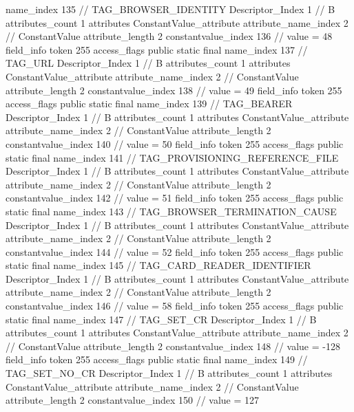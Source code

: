 {{{{{				name_index	135		// TAG_BROWSER_IDENTITY
				Descriptor_Index	1		// B
				attributes_count	1
				attributes {
				ConstantValue_attribute {
					attribute_name_index	2		// ConstantValue
					attribute_length	2
					constantvalue_index	136		// value = 48
				}
				}
			}
			field_info {
				token	255
				access_flags	public static final
				name_index	137		// TAG_URL
				Descriptor_Index	1		// B
				attributes_count	1
				attributes {
				ConstantValue_attribute {
					attribute_name_index	2		// ConstantValue
					attribute_length	2
					constantvalue_index	138		// value = 49
				}
				}
			}
			field_info {
				token	255
				access_flags	public static final
				name_index	139		// TAG_BEARER
				Descriptor_Index	1		// B
				attributes_count	1
				attributes {
				ConstantValue_attribute {
					attribute_name_index	2		// ConstantValue
					attribute_length	2
					constantvalue_index	140		// value = 50
				}
				}
			}
			field_info {
				token	255
				access_flags	public static final
				name_index	141		// TAG_PROVISIONING_REFERENCE_FILE
				Descriptor_Index	1		// B
				attributes_count	1
				attributes {
				ConstantValue_attribute {
					attribute_name_index	2		// ConstantValue
					attribute_length	2
					constantvalue_index	142		// value = 51
				}
				}
			}
			field_info {
				token	255
				access_flags	public static final
				name_index	143		// TAG_BROWSER_TERMINATION_CAUSE
				Descriptor_Index	1		// B
				attributes_count	1
				attributes {
				ConstantValue_attribute {
					attribute_name_index	2		// ConstantValue
					attribute_length	2
					constantvalue_index	144		// value = 52
				}
				}
			}
			field_info {
				token	255
				access_flags	public static final
				name_index	145		// TAG_CARD_READER_IDENTIFIER
				Descriptor_Index	1		// B
				attributes_count	1
				attributes {
				ConstantValue_attribute {
					attribute_name_index	2		// ConstantValue
					attribute_length	2
					constantvalue_index	146		// value = 58
				}
				}
			}
			field_info {
				token	255
				access_flags	public static final
				name_index	147		// TAG_SET_CR
				Descriptor_Index	1		// B
				attributes_count	1
				attributes {
				ConstantValue_attribute {
					attribute_name_index	2		// ConstantValue
					attribute_length	2
					constantvalue_index	148		// value = -128
				}
				}
			}
			field_info {
				token	255
				access_flags	public static final
				name_index	149		// TAG_SET_NO_CR
				Descriptor_Index	1		// B
				attributes_count	1
				attributes {
				ConstantValue_attribute {
					attribute_name_index	2		// ConstantValue
					attribute_length	2
					constantvalue_index	150		// value = 127
}}}}}}}
